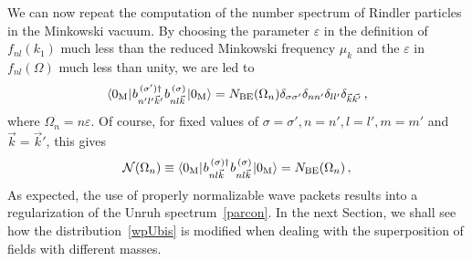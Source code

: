 \documentclass[floats,prd,aps,amssymb,nofootinbib,showkeys]{revtex4}
\newcommand{\be}{\begin{equation}}\newcommand{\ee}{\end{equation}}
\begin{document}
We can now repeat the computation of the
number spectrum of Rindler particles in the Minkowski
vacuum. By choosing the parameter $\varepsilon$
in the definition of $f_{nl}(k_1)$ much less than the
reduced Minkowski frequency $\mu_k$ and 
the $\varepsilon$ in $f_{nl}(\Omega)$ much less than unity, 
we are led to~\cite{Takagi}
\be
\label{wpU}
\langle0_{\mathrm{M}}|\hspace{0.2mm}b_{n'l'\vec{k}'}^{\,(\sigma')\dagger}\hspace{0.1mm}b_{nl\vec{k}}^{\,(\sigma)}\hspace{0.2mm}|0_{\mathrm{M}}\rangle=N_{\mathrm{BE}}({\Omega_n})\delta_{\sigma\sigma'}\delta_{nn'}\delta_{ll'}\delta_{\vec{k}\vec{k'}}\,,
\ee
where $\Omega_n=n\varepsilon$. Of course, 
for fixed values of $\sigma=\sigma', n=n', l=l', m=m'$ and $\vec{k}=\vec{k}'$, this gives
\be
\label{wpUbis}
\mathcal{N}(\Omega_n)\equiv\langle0_{\mathrm{M}}|\hspace{0.2mm}b_{nl\vec{k}}^{\,(\sigma)\dagger}\hspace{0.1mm}b_{nl\vec{k}}^{\,(\sigma)}\hspace{0.2mm}|0_{\mathrm{M}}\rangle=N_{\mathrm{BE}}({\Omega_n})\,,
\ee 
As expected, the use
of properly normalizable wave packets results into a 
regularization of the Unruh spectrum~\eqref{parcon}. In the next Section, 
we shall see how the distribution~\eqref{wpUbis} 
is modified when dealing with the superposition of fields
with different masses. 
\end{document}
